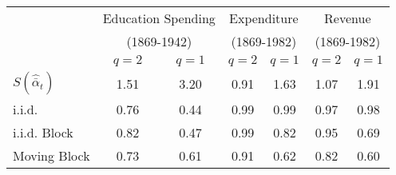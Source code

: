\begin{tabular}{@{}lcccccc@{}}
		\toprule
		 & \multicolumn{2}{c}{Education Spending}        & \multicolumn{2}{c}{Expenditure}           & \multicolumn{2}{c}{Revenue}                \\ 
		 		 & \multicolumn{2}{c}{(1869-1942)}        & \multicolumn{2}{c}{(1869-1982)}            & \multicolumn{2}{c}{(1869-1982)}                \\ \midrule
	 & $q=2$    & $q=1$      & $q=2$      & $q=1$     & $q=2$      & $q=1$  	   \\
		\hline
		$S (\hat{\bar{\alpha}}_{t})$        &   1.51       	 & 	3.20       	  & 	0.91       &    1.63       &    1.07	       & 	1.91	   \\
		i.i.d.                      		& 	0.76		 & 0.44			  & 	0.99	   & 	0.99	   & 	0.97		   & 	0.98			 \\
		i.i.d. Block                        & 	0.82  		 & 0.47			  & 	0.99   	   & 	0.82	   & 	0.95		   & 	0.69  \\
		Moving Block                        & 	0.73	     & 0.61			  & 	0.91	   & 	0.62	   & 	0.82 		   & 	0.60  \\ \bottomrule
\end{tabular}
